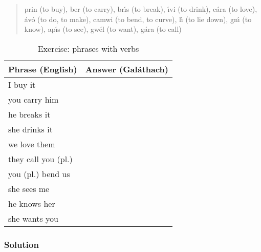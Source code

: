 \begin{quote}
prin (to buy), ber (to carry), br\'{\i}s (to break), \'{\i}vi (to drink), c\'{a}ra (to love), \'{a}v\'{o} (to do, to make), camwi (to bend, to curve), l\'{\i} (to lie down), gn\'{\i} (to know), ap\'{\i}s (to see), gw\'{e}l (to want), g\'{a}ra (to call)
\end{quote}

\begin{table}[H]
\centering
\begin{tabular}{|l|M{10.0cm}|}
  \toprule
  \textbf{Phrase (English)} & \textbf{Answer (Gal\'{a}thach)}\\
  \toprule
  I buy it & \\
  \midrule
  you carry him & \\
  \midrule
  he breaks it & \\
  \midrule
  she drinks it & \\
  \midrule
  we love them & \\
  \midrule
  they call you (pl.) & \\
  \midrule
  you (pl.) bend us & \\
  \midrule
  she sees me & \\
  \midrule
  he knows her & \\
  \midrule
  she wants you & \\
  \bottomrule
\end{tabular}
\label{exercise_phrases_with_verbs}
\caption{Exercise: phrases with verbs}
\end{table}

\newpage
\subsubsection{Solution}
\begin{table}[H]
\centering
{}
\label{solution_phrases_with_verbs}
\caption{Solution: phrases with verbs}
\end{table}



